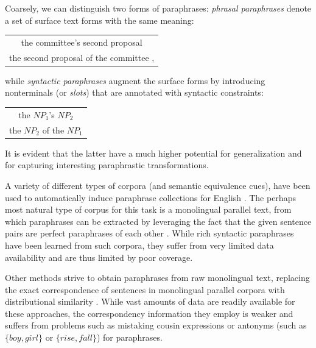 \documentclass[11pt]{article}
\begin{document}
Coarsely, we can distinguish two forms of paraphrases: \emph{phrasal
  paraphrases} denote a set of surface text forms with the same
meaning:
\begin{center}
\begin{tabular}{c}
the committee's second proposal \\
the second proposal of the committee ,
\end{tabular}
\end{center}
while \emph{syntactic paraphrases} augment the surface forms by
introducing nonterminals (or \emph{slots}) that are annotated with
syntactic constraints:
\begin{center}
\begin{tabular}{c}
the $\mathit{NP}_1$'s $\mathit{NP}_2$ \\
the $\mathit{NP}_2$ of the $\mathit{NP}_1$
\end{tabular}
\end{center}
It is evident that the latter have a much higher potential for
generalization and for capturing interesting paraphrastic transformations.

A variety of different types of corpora (and semantic equivalence
cues), have been used to automatically induce paraphrase collections
for English \cite{Madnani2010}. The perhaps most natural type of corpus for this task is
a monolingual parallel text, from which paraphrases can be extracted
by leveraging the fact that the given sentence pairs are perfect
paraphrases of each other \cite{Barzilay2001,Pang2003}. While rich
syntactic paraphrases have been learned from such corpora, they suffer
from very limited data availability and are thus limited by poor
coverage.

Other methods strive to obtain paraphrases from raw monolingual text,
replacing the exact correspondence of sentences in monolingual parallel corpora with
distributional similarity \cite{Lin2001,Bhagat2008}. While
vast amounts of data are readily available for these approaches, the
correspondency information they employ is weaker and suffers from
problems such as mistaking cousin expressions or antonyms (such as
$\{\mathit{boy}, \mathit{girl}\}$ or $\{\mathit{rise},
\mathit{fall}\}$) for paraphrases.
\end{document}
